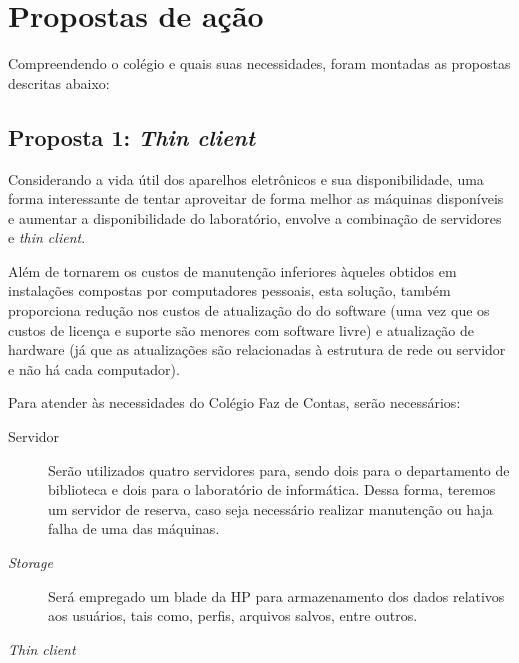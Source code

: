 \documentclass[a4paper,12pt]{report}
\begin{document}
        \section{Propostas de ação}
        \label{sc:laboratorio_proposta}
        Compreendendo o colégio e quais suas necessidades, foram montadas
        as propostas descritas abaixo:

            \subsection{Proposta 1: \emph{Thin client}}
            Considerando a vida útil dos aparelhos eletrônicos e sua
            disponibilidade, uma forma interessante de tentar aproveitar de
            forma melhor as máquinas disponíveis e aumentar a disponibilidade
            do laboratório, envolve a combinação de servidores e \emph{thin
            client}.

            Além de tornarem os custos de manutenção inferiores àqueles
            obtidos em instalações compostas por computadores pessoais, esta
            solução, também proporciona redução nos custos de atualização do
            do software (uma vez que os custos de licença e suporte são
            menores com software livre) e atualização de hardware (já que as
            atualizações são relacionadas à estrutura de rede ou servidor e não
            há cada computador).

            Para atender às necessidades do Colégio Faz de Contas, serão
            necessários:

            \begin{description}

                \item[Servidor] Serão utilizados quatro servidores para, sendo
                dois para o departamento de biblioteca e dois para o
                laboratório de informática. Dessa forma, teremos um servidor
                de reserva, caso seja necessário realizar manutenção ou
                haja falha de uma das máquinas.

                \item[\emph{Storage}] Será empregado um blade da HP para
                armazenamento dos dados relativos aos usuários, tais como,
                perfis, arquivos salvos, entre outros.

                \item[\emph{Thin client}]

            \end{description}
\end{document}
